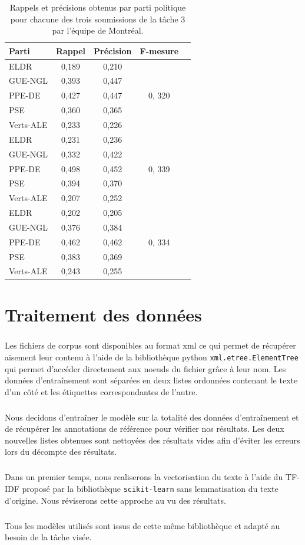 \documentclass[11pt]{article}
\begin{document}
 \begin{table}[h]
 \begin{tabular}{lcccc}
 \hline
 Parti & Rappel & Précision & F-mesure\\
 \hline
 ELDR & 0,189 & 0,210 &\multirow{5}{*}{0, 320}\\
 GUE-NGL & 0,393 & 0,447\\
 PPE-DE & 0,427 & 0,447\\
 PSE & 0,360 & 0,365 \\
 Verts-ALE & 0,233 & 0,226\\
 \hline
 ELDR & 0,231 & 0,236 &\multirow{5}{*}{0, 339}\\
 GUE-NGL & 0,332 & 0,422\\
 PPE-DE & 0,498 & 0,452\\
 PSE & 0,394 & 0,370 \\
 Verts-ALE & 0,207 & 0,252\\
 \hline
  ELDR & 0,202 & 0,205 &\multirow{5}{*}{0, 334}\\
 GUE-NGL & 0,376 & 0,384\\
 PPE-DE & 0,462 & 0,462\\
 PSE & 0,383 & 0,369 \\
 Verts-ALE & 0,243 & 0,255\\
 \hline
 \end{tabular}
 \caption{Rappels et précisions obtenus par parti politique pour chacune des trois soumissions de la tâche 3 par l’équipe de Montréal.}
 \label{tab:etatArt}
 \end{table}

\section{Traitement des données}

\subparagraph{}
Les fichiers de corpus sont disponibles au format xml ce qui permet de récupérer aisement leur contenu à l'aide de la bibliothèque python \texttt{xml.etree.ElementTree} qui permet d'accéder directement aux noeuds du fichier grâce à leur nom. Les données d'entraînement sont séparées en deux listes ordonnées contenant le texte d'un côté et les étiquettes correspondantes de l'autre.
\subparagraph{}
Nous decidons d'entraîner le modèle sur la totalité des données d'entraînement et de récupérer les annotations de référence pour vérifier nos résultats. Les deux nouvelles listes obtenues sont nettoyées des résultats vides afin d'éviter les erreurs lors du décompte des résultats.
\subparagraph{}
Dans un premier temps, nous realiserons la vectorisation du texte à l'aide du TF-IDF proposé par la bibliothèque \texttt{scikit-learn} sans lemmatisation du texte d'origine. Nous réviserons cette approche au vu des résultats.
\subparagraph{}
Tous les modèles utilisés sont issus de cette même bibliothèque et adapté au besoin de la tâche visée.
\end{document}
